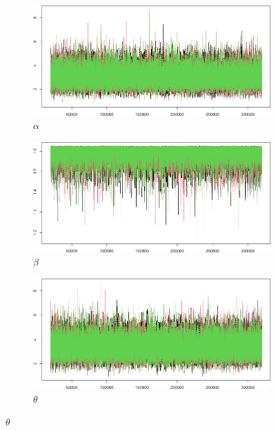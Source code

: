 \documentclass{Class/julia}
\begin{document}
\begin{figure}[!ht]
    \centering
    \caption{Trace Plots After Thinning}
    \label{fig:7}
    \begin{subfigure}{0.45\textwidth}
        \centering
        \includegraphics[width=\textwidth]{rytgaard1990/trace_after_thinning_alpha.png}
        \caption{\( \alpha \)}
    \end{subfigure}
    \hfill
    \begin{subfigure}{0.45\textwidth}
        \centering
        \includegraphics[width=\textwidth]{rytgaard1990/trace_after_thinning_beta.png}
        \caption{\( \beta \)}
    \end{subfigure}

    \vspace{1em}

    \begin{subfigure}{0.45\textwidth}
        \centering
        \includegraphics[width=\textwidth]{rytgaard1990/trace_after_thinning_theta.png}
        \caption{\( \theta \)}
    \end{subfigure}
\end{figure}
\end{document}
